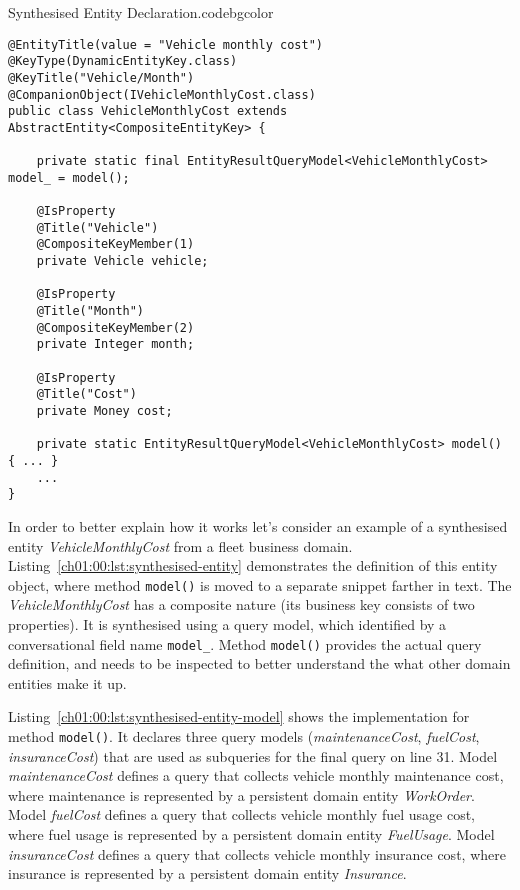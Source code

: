   \begin{code}{Synthesised Entity Declaration.}{\label{ch01:00:lst:synthesised-entity}}{codebgcolor}
    \begin{lstlisting}[numbersep=10pt]
@EntityTitle(value = "Vehicle monthly cost")
@KeyType(DynamicEntityKey.class)
@KeyTitle("Vehicle/Month")
@CompanionObject(IVehicleMonthlyCost.class)
public class VehicleMonthlyCost extends AbstractEntity<CompositeEntityKey> {
    
    private static final EntityResultQueryModel<VehicleMonthlyCost> model_ = model();

    @IsProperty
    @Title("Vehicle")
    @CompositeKeyMember(1)
    private Vehicle vehicle;

    @IsProperty    
    @Title("Month")
    @CompositeKeyMember(2)
    private Integer month;

    @IsProperty    
    @Title("Cost")
    private Money cost;

    private static EntityResultQueryModel<VehicleMonthlyCost> model() { ... }  
    ...
}
    \end{lstlisting}   
  \end{code}  
  
  In order to better explain how it works let's consider an example of a synthesised entity \emph{VehicleMonthlyCost} from a fleet business domain.
  Listing~\ref{ch01:00:lst:synthesised-entity} demonstrates the definition of this entity object, where method \texttt{model()} is moved to a separate snippet farther in text.
  The \emph{VehicleMonthlyCost} has a composite nature (its business key consists of two properties).
  It is synthesised using a query model, which identified by a conversational field name \texttt{model\_}.
  Method \texttt{model()} provides the actual query definition, and needs to be inspected to better understand the what other domain entities make it up.
  
  Listing~\ref{ch01:00:lst:synthesised-entity-model} shows the implementation for method \texttt{model()}.
  It declares three query models (\emph{maintenanceCost}, \emph{fuelCost}, \emph{insuranceCost}) that are used as subqueries for the final query on line 31.
  Model \emph{maintenanceCost} defines a query that collects vehicle monthly maintenance cost, where maintenance is represented by a persistent domain entity \emph{WorkOrder}.
  Model \emph{fuelCost} defines a query that collects vehicle monthly fuel usage cost, where fuel usage is represented by a persistent domain entity \emph{FuelUsage}.
  Model \emph{insuranceCost} defines a query that collects vehicle monthly insurance cost, where insurance is represented by a persistent domain entity \emph{Insurance}.
  

